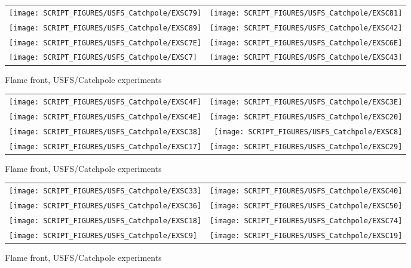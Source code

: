 \begin{figure}[p]
\begin{tabular*}{\textwidth}{l@{\extracolsep{\fill}}r}
\texttt{[image: SCRIPT\_FIGURES/USFS\_Catchpole/EXSC79]} &
\texttt{[image: SCRIPT\_FIGURES/USFS\_Catchpole/EXSC81]} \\
\texttt{[image: SCRIPT\_FIGURES/USFS\_Catchpole/EXSC89]} &
\texttt{[image: SCRIPT\_FIGURES/USFS\_Catchpole/EXSC42]} \\
\texttt{[image: SCRIPT\_FIGURES/USFS\_Catchpole/EXSC7E]} &
\texttt{[image: SCRIPT\_FIGURES/USFS\_Catchpole/EXSC6E]} \\
\texttt{[image: SCRIPT\_FIGURES/USFS\_Catchpole/EXSC7]} &
\texttt{[image: SCRIPT\_FIGURES/USFS\_Catchpole/EXSC43]} \\
\end{tabular*}
\caption[Flame front, USFS/Catchpole experiments]{Flame front, USFS/Catchpole experiments}
\label{USFS_Catchpole_136}
\end{figure}

\begin{figure}[p]
\begin{tabular*}{\textwidth}{l@{\extracolsep{\fill}}r}
\texttt{[image: SCRIPT\_FIGURES/USFS\_Catchpole/EXSC4F]} &
\texttt{[image: SCRIPT\_FIGURES/USFS\_Catchpole/EXSC3E]} \\
\texttt{[image: SCRIPT\_FIGURES/USFS\_Catchpole/EXSC4E]} &
\texttt{[image: SCRIPT\_FIGURES/USFS\_Catchpole/EXSC20]} \\
\texttt{[image: SCRIPT\_FIGURES/USFS\_Catchpole/EXSC38]} &
\texttt{[image: SCRIPT\_FIGURES/USFS\_Catchpole/EXSC8]} \\
\texttt{[image: SCRIPT\_FIGURES/USFS\_Catchpole/EXSC17]} &
\texttt{[image: SCRIPT\_FIGURES/USFS\_Catchpole/EXSC29]} \\
\end{tabular*}
\caption[Flame front, USFS/Catchpole experiments]{Flame front, USFS/Catchpole experiments}
\label{USFS_Catchpole_144}
\end{figure}

\begin{figure}[p]
\begin{tabular*}{\textwidth}{l@{\extracolsep{\fill}}r}
\texttt{[image: SCRIPT\_FIGURES/USFS\_Catchpole/EXSC33]} &
\texttt{[image: SCRIPT\_FIGURES/USFS\_Catchpole/EXSC40]} \\
\texttt{[image: SCRIPT\_FIGURES/USFS\_Catchpole/EXSC36]} &
\texttt{[image: SCRIPT\_FIGURES/USFS\_Catchpole/EXSC50]} \\
\texttt{[image: SCRIPT\_FIGURES/USFS\_Catchpole/EXSC18]} &
\texttt{[image: SCRIPT\_FIGURES/USFS\_Catchpole/EXSC74]} \\
\texttt{[image: SCRIPT\_FIGURES/USFS\_Catchpole/EXSC9]} &
\texttt{[image: SCRIPT\_FIGURES/USFS\_Catchpole/EXSC19]} \\
\end{tabular*}
\caption[Flame front, USFS/Catchpole experiments]{Flame front, USFS/Catchpole experiments}
\label{USFS_Catchpole_152}
\end{figure}

